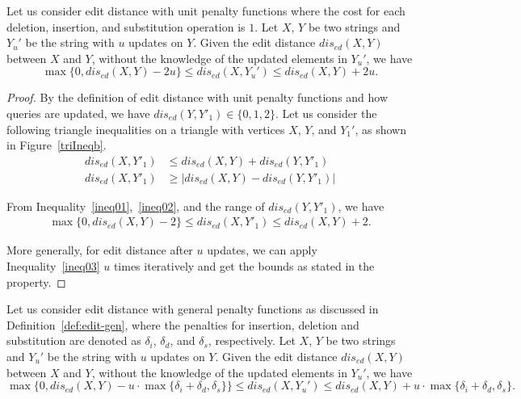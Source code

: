 \begin{property}\label{ppt:bound-ed}

Let us consider edit distance with unit penalty functions where the cost for each deletion, insertion, and substitution operation is $1$. Let $X$, $Y$ be two strings and $Y_u'$ be the string with $u$ updates on $Y$. Given the edit distance $dis_{ed}(X, Y)$ between $X$ and $Y$, without the knowledge of the updated elements in $Y_u'$, we have 
$$\max\{0, dis_{ed}(X, Y) - 2u\} \leq dis_{ed}(X, Y_u') \leq dis_{ed}(X, Y) + 2u.$$

\end{property}

\begin{proof}
By the definition of edit distance with unit penalty functions and how queries are updated, we have $dis_{ed}(Y, Y'_1)\in \{0,1,2\}$. Let us consider the following triangle inequalities on a triangle with vertices $X$, $Y$, and $Y_1'$, as shown in Figure~\ref{triIneqb}. 
\begin{align}
dis_{ed}(X, Y'_1) &\leq dis_{ed}(X, Y) + dis_{ed}(Y, Y'_1) \label{ineq01}\\
dis_{ed}(X, Y'_1) &\geq |dis_{ed}(X, Y)-dis_{ed}(Y, Y'_1)| \label{ineq02}
\end{align}

From Inequality~\ref{ineq01},~\ref{ineq02}, and the range of $dis_{ed}(Y, Y'_1)$, we have 
\begin{align}\label{ineq03}
\max\{0, dis_{ed}(X, Y) - 2\} \leq dis_{ed}(X, Y'_1) \leq dis_{ed}(X, Y) + 2.
\end{align}

More generally, for edit distance after $u$ updates, we can apply Inequality~\ref{ineq03} $u$ times iteratively and get the bounds as stated in the property.
\end{proof}

\begin{property}\label{ppt:bound-ed-gen}

Let us consider edit distance with general penalty functions as discussed in Definition~\ref{def:edit-gen}, where the penalties for insertion, deletion and substitution are denoted as $\delta_i$, $\delta_d$, and $\delta_s$, respectively.  Let $X$, $Y$ be two strings and $Y_u'$ be the string with $u$ updates on $Y$.  Given the edit distance $dis_{ed}(X, Y)$ between $X$ and $Y$, without the knowledge of the updated elements in $Y_u'$, we have 
$$\max\{0, dis_{ed}(X, Y) - u \cdot \max\{\delta_i + \delta_d, \delta_s\} \} \leq dis_{ed}(X, Y_u') \leq dis_{ed}(X, Y) + u \cdot \max\{\delta_i+\delta_d, \delta_s\}\text{.}$$
\end{property}

